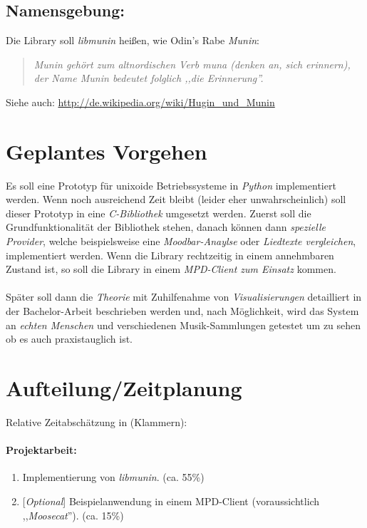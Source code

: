 \documentclass[8pt,a4paper,ngerman]{scrartcl}
\begin{document}
    \subsection{Namensgebung:}

        Die Library soll \emph{libmunin} heißen, wie Odin's Rabe \emph{Munin}:

        \begin{quote}
            \textit{Munin gehört zum altnordischen Verb muna (denken an, sich erinnern), 
            der Name Munin bedeutet folglich ,,die Erinnerung''.}
        \end{quote}

        Siehe auch: \url{http://de.wikipedia.org/wiki/Hugin_und_Munin}

\section{Geplantes Vorgehen}
    Es soll eine Prototyp für unixoide Betriebssysteme in \emph{Python}
    implementiert werden. Wenn noch
    ausreichend Zeit bleibt (leider eher unwahrscheinlich) soll dieser Prototyp in eine
    \emph{C-Bibliothek} umgesetzt werden. Zuerst soll die Grundfunktionalität der
    Bibliothek stehen, danach können dann \emph{spezielle Provider}, welche
    beispielsweise eine \emph{Moodbar-Anaylse} oder \emph{Liedtexte vergleichen}, implementiert
    werden. Wenn die Library rechtzeitig in einem annehmbaren Zustand ist, so soll
    die Library in einem \emph{MPD-Client zum Einsatz} kommen. 
    \\
    \\
    Später soll dann die \emph{Theorie} mit Zuhilfenahme von \emph{Visualisierungen} detailliert in 
    der Bachelor-Arbeit beschrieben werden und, nach Möglichkeit, wird das System an 
    \emph{echten Menschen} und verschiedenen Musik-Sammlungen getestet um zu
    sehen ob es auch praxistauglich ist.

\section{Aufteilung/Zeitplanung}
    Relative Zeitabschätzung in (Klammern):

    \paragraph{Projektarbeit:}
        \begin{enumerate} 
            \item Implementierung von \emph{libmunin}. (ca. 55\%)
            \item {[}\emph{Optional}{]} Beispielanwendung in einem MPD-Client (voraussichtlich
                ,,\emph{Moosecat}''). (ca. 15\%)
        \end{enumerate}
\end{document}
